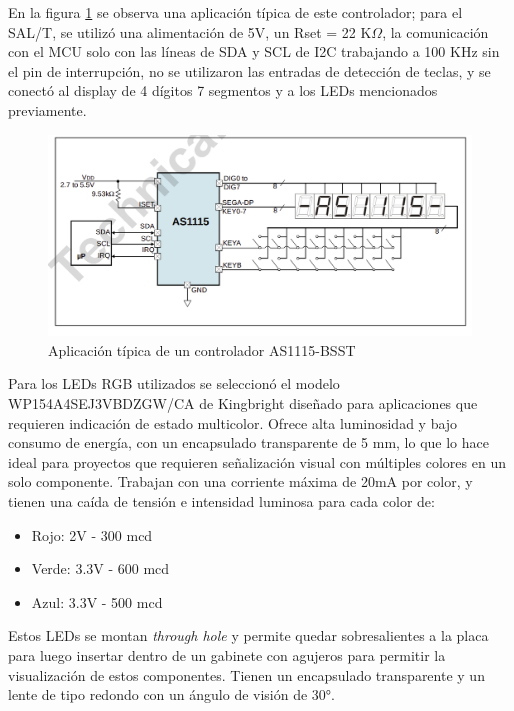 En la figura \ref{fig:led_driver} se observa una aplicación típica de este controlador; para el SAL/T, se utilizó una alimentación de 5V, un Rset = 22 K$\Omega$, la comunicación con el MCU solo con las líneas de SDA y SCL de I2C trabajando a 100 KHz sin el pin de interrupción, no se utilizaron las entradas de detección de teclas, y se conectó al display de 4 dígitos 7 segmentos y a los LEDs mencionados previamente. \\

\begin{figure}[H]
    \centering
    \includegraphics[width = \linewidth]{img/led_driver.png}
    \caption{Aplicación típica de un controlador AS1115-BSST}
    \label{fig:led_driver}
\end{figure}    




Para los LEDs RGB utilizados se seleccionó el modelo WP154A4SEJ3VBDZGW/CA de Kingbright \cite{WP154A4SEJ3VBDZGW/CA} diseñado para aplicaciones que requieren indicación de estado multicolor. Ofrece alta luminosidad y bajo consumo de energía, con un encapsulado transparente de 5 mm, lo que lo hace ideal para proyectos que requieren señalización visual con múltiples colores en un solo componente. Trabajan con una corriente máxima de 20mA por color, y tienen una caída de tensión e intensidad luminosa para cada color de: 

\begin{itemize}
    \item Rojo: 2V - 300 mcd
    \item Verde: 3.3V - 600 mcd
    \item Azul: 3.3V - 500 mcd
\end{itemize}

Estos LEDs se montan \textit{through hole} y permite quedar sobresalientes a la placa para luego insertar dentro de un gabinete con agujeros para permitir la visualización de estos componentes. Tienen un encapsulado transparente y un lente de tipo redondo con un ángulo de visión de 30°.\\ 

